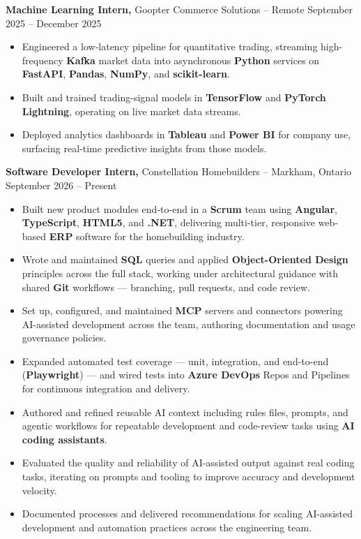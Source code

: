 \documentclass[11pt]{article}
\begin{document}
\smallskip
\textbf{Machine Learning Intern,} {Goopter Commerce Solutions} -- Remote \hfill September 2025 -- December 2025 \\
\begin{itemize}
  \item Engineered a low-latency pipeline for quantitative trading, streaming high-frequency \textbf{Kafka} market data into asynchronous \textbf{Python} services on \textbf{FastAPI}, \textbf{Pandas}, \textbf{NumPy}, and \textbf{scikit-learn}.
  \item Built and trained trading-signal models in \textbf{TensorFlow} and \textbf{PyTorch Lightning}, operating on live market data streams.
  \item Deployed analytics dashboards in \textbf{Tableau} and \textbf{Power BI} for company use, surfacing real-time predictive insights from those models.
\end{itemize}

\smallskip
\textbf{Software Developer Intern,} {Constellation Homebuilders} -- Markham, Ontario \hfill September 2026 -- Present \\
\begin{itemize}
  \item Built new product modules end-to-end in a \textbf{Scrum} team using \textbf{Angular}, \textbf{TypeScript}, \textbf{HTML5}, and \textbf{.NET}, delivering multi-tier, responsive web-based \textbf{ERP} software for the homebuilding industry.
  \item Wrote and maintained \textbf{SQL} queries and applied \textbf{Object-Oriented Design} principles across the full stack, working under architectural guidance with shared \textbf{Git} workflows — branching, pull requests, and code review.
  \item Set up, configured, and maintained \textbf{MCP} servers and connectors powering AI-assisted development across the team, authoring documentation and usage governance policies.
  \item Expanded automated test coverage — unit, integration, and end-to-end (\textbf{Playwright}) — and wired tests into \textbf{Azure DevOps} Repos and Pipelines for continuous integration and delivery.
  \item Authored and refined reusable AI context including rules files, prompts, and agentic workflows for repeatable development and code-review tasks using \textbf{AI coding assistants}.
  \item Evaluated the quality and reliability of AI-assisted output against real coding tasks, iterating on prompts and tooling to improve accuracy and development velocity.
  \item Documented processes and delivered recommendations for scaling AI-assisted development and automation practices across the engineering team.
\end{itemize}
\end{document}
